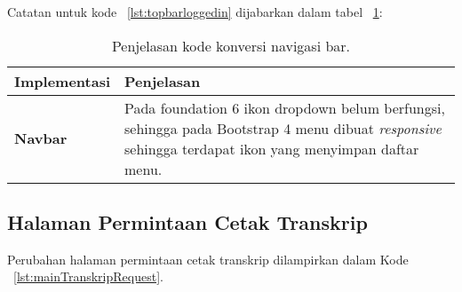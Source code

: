 \noindent Catatan untuk kode ~\ref{lst:topbarloggedin} dijabarkan dalam tabel ~\ref{tabel:KodeLogin}:
\begin{table}[H]
	\centering
	\begin{tabularx}{\textwidth}{lX}
		\toprule
		Implementasi     & Penjelasan \\
		\midrule
		\textbf{Navbar} & Pada foundation 6 ikon dropdown belum berfungsi, sehingga pada Bootstrap 4 menu dibuat \textit{responsive} sehingga terdapat ikon yang menyimpan daftar menu.\\
		\bottomrule
	\end{tabularx}%
	\caption{Penjelasan kode konversi navigasi bar.}
	\label{tabel:KodeLogin}
\end{table}

\subsection{Halaman Permintaan Cetak Transkrip }
Perubahan halaman permintaan cetak transkrip dilampirkan dalam Kode ~\ref{lst:mainTranskripRequest}.
